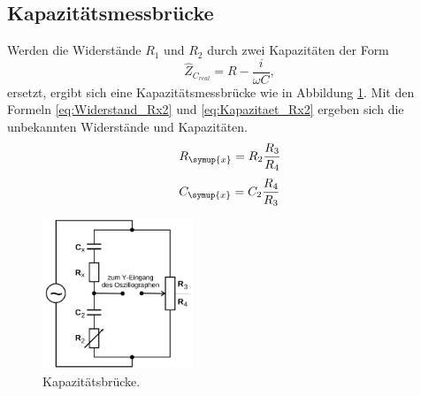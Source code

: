 \subsection{Kapazitätsmessbrücke}
Werden die Widerstände $R_1$ und $R_2$ durch zwei Kapazitäten der Form
\begin{equation}
\hat{Z}_{C_{real}}=R-\frac{i}{\omega C}  ,
\end{equation}
ersetzt, ergibt sich eine Kapazitätsmessbrücke wie in Abbildung \ref{fig:capbruecke}.
Mit den Formeln \eqref{eq:Widerstand_Rx2} und \eqref{eq:Kapazitaet_Rx2} ergeben
sich die unbekannten Widerstände und Kapazitäten.
\begin{equation}
R_\symup{x}=R_2\frac{R_3}{R_4}
\label{eq:Widerstand_Rx2}
\end{equation}
\begin{equation}
C_\symup{x}=C_2\frac{R_4}{R_3}
\label{eq:Kapazitaet_Rx2}
\end{equation}
\begin{figure}
  \centering
  \includegraphics[width=0.4\textwidth]{Bilder/Capazitaetsbruecke.png}
  \caption{Kapazitätsbrücke\cite{sample}.}
  \label{fig:capbruecke}
\end{figure}
